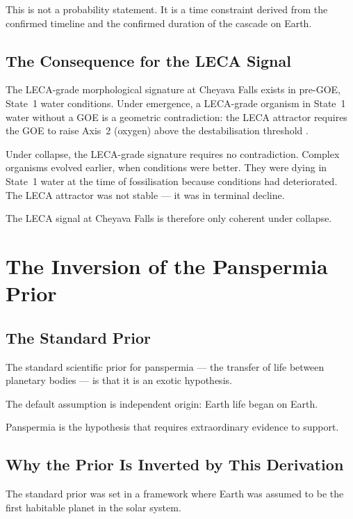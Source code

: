 \documentclass[11pt, a4paper]{article}
\begin{document}
This is not a probability statement.
It is a time constraint derived from
the confirmed timeline and the confirmed
duration of the cascade on Earth.

\subsection{The Consequence for
the LECA Signal}

The LECA-grade morphological signature at
Cheyava Falls exists in pre-GOE, State~1
water conditions.
Under emergence, a LECA-grade organism
in State~1 water without a GOE is
a geometric contradiction:
the LECA attractor requires the GOE to
raise Axis~2 (oxygen) above the
destabilisation threshold
\cite{marspreregistration}.

Under collapse, the LECA-grade signature
requires no contradiction.
Complex organisms evolved earlier,
when conditions were better.
They were dying in State~1 water at
the time of fossilisation because
conditions had deteriorated.
The LECA attractor was not stable ---
it was in terminal decline.

The LECA signal at Cheyava Falls
is therefore only coherent under collapse.

\section{The Inversion of the Panspermia Prior}

\subsection{The Standard Prior}

The standard scientific prior for panspermia
--- the transfer of life between planetary bodies ---
is that it is an exotic hypothesis.

The default assumption is independent origin:
Earth life began on Earth.

Panspermia is the hypothesis that requires
extraordinary evidence to support.

\subsection{Why the Prior Is Inverted
by This Derivation}

The standard prior was set in a framework
where Earth was assumed to be the first
habitable planet in the solar system.
\end{document}
